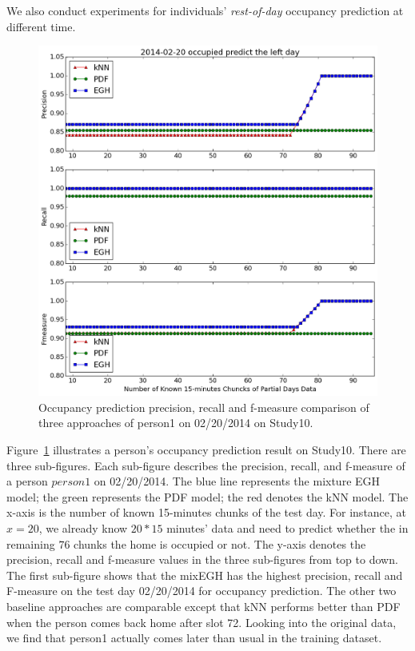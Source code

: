 We also conduct experiments for individuals' {\em rest-of-day} occupancy prediction at different time. 
\begin{figure}[h]
\centering
\includegraphics[width=1.0\textwidth]{adlfigs/study10person12014-02-20occupied.png}
\caption{Occupancy prediction precision, recall and f-measure comparison of three approaches 
of person1 on 02/20/2014 on Study10.}
\label{fig_study10}
\end{figure}
Figure~\ref{fig_study10} illustrates a person's occupancy prediction result on Study10.
There are three sub-figures. 
Each sub-figure describes the 
precision, recall, and f-measure 
of a person $person1$ on 02/20/2014. 
The blue line represents the mixture EGH model;
the green represents the PDF model;
the red denotes the kNN model. 
The x-axis is the number of known 15-minutes chunks of the test day. 
For instance, at $x=20$, 
we already know $20*15$ minutes' data 
and need to predict whether the in remaining $76$ chunks 
the home is occupied or not.
The y-axis denotes the precision, recall and f-measure values 
in the three sub-figures from top to down. 
The first sub-figure shows that  
the mixEGH has the highest precision, recall and F-measure on the test day 02/20/2014 
for occupancy prediction. The other two baseline approaches are comparable except that kNN performs better than PDF 
when the person comes back home after slot 72. 
Looking into the original data, we find that person1 actually comes later than usual 
in the training dataset. 

